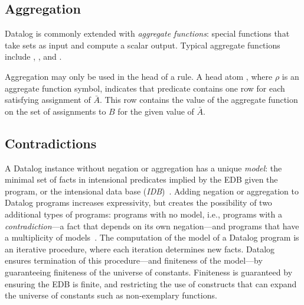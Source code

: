 \subsection{Aggregation}

Datalog is commonly extended with {\em aggregate functions}: special
functions that take sets as input and compute a scalar output. Typical aggregate
functions include , , and .


Aggregation may only be used in the head of a rule.  A head atom
, where $\rho$ is an aggregate function symbol,
indicates that predicate  contains one row for each satisfying
assignment of $\bar{A}$.  This row contains the value of the aggregate function
on the set of assignments to $B$ for the given value of $\bar{A}$. 

\subsection{Contradictions}

A Datalog instance without negation or aggregation has a unique {\em model}: the
minimal set of facts in intensional predicates implied by the EDB given the
program, or the intensional data base ({\em IDB})~\cite{ullmanbook}.  Adding
negation or aggregation to Datalog programs increases expressivity, but creates
the possibility of two additional types of programs: programs with no model,
i.e., programs with a {\em contradiction}---a fact that depends on its own
negation---and programs that have a multiplicity of
models~\cite{sacca-zaniolo}.  The computation of the model of a Datalog program
is an iterative procedure, where each iteration determines new facts.  Datalog
ensures termination of this procedure---and finiteness of the model---by
guaranteeing finiteness of the universe of constants.  Finiteness is guaranteed
by ensuring the EDB is finite, and restricting the use of constructs that can
expand the universe of constants such as non-exemplary functions.

